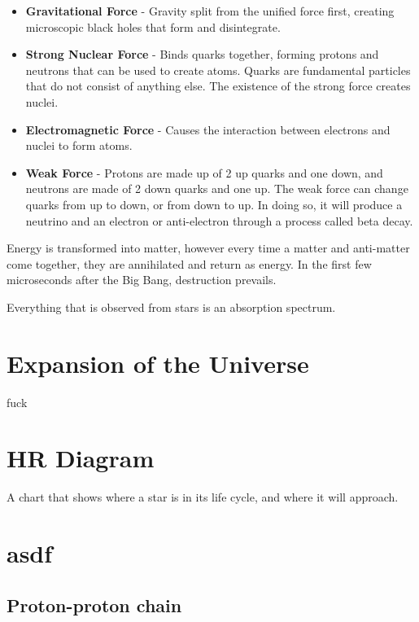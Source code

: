 			\begin{itemize}
				\item \textbf{Gravitational Force} - Gravity split from the unified force first, creating microscopic black holes that form and disintegrate.

				\item \textbf{Strong Nuclear Force} - Binds quarks together, forming protons and neutrons that can be used to create atoms. Quarks are fundamental particles that do not consist of anything else. The existence of the strong force creates nuclei.

				\item \textbf{Electromagnetic Force} - Causes the interaction between electrons and nuclei to form atoms.

				\item \textbf{Weak Force} - Protons are made up of 2 up quarks and one down, and neutrons are made of 2 down quarks and one up. The weak force can change quarks from up to down, or from down to up. In doing so, it will produce a neutrino and an electron or anti-electron through a process called beta decay.
			\end{itemize}
		
			Energy is transformed into matter, however every time a matter and anti-matter come together, they are annihilated and return as energy. In the first few microseconds after the Big Bang, destruction prevails.

			Everything that is observed from stars is an absorption spectrum. 

\section{Expansion of the Universe} \label{04/06/2025}

	fuck

\section{HR Diagram}

	A chart that shows where a star is in its life cycle, and where it will approach.

\section{asdf}

	\subsection{Proton-proton chain}
	
